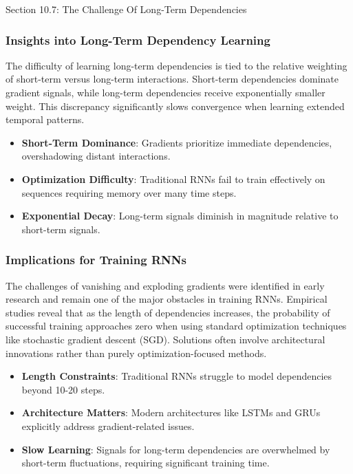 \begin{notes}{Section 10.7: The Challenge Of Long-Term Dependencies}
    \subsubsection*{Insights into Long-Term Dependency Learning}
    
    The difficulty of learning long-term dependencies is tied to the relative weighting of short-term versus long-term interactions. Short-term dependencies dominate gradient signals, while long-term 
    dependencies receive exponentially smaller weight. This discrepancy significantly slows convergence when learning extended temporal patterns.
    
    \begin{highlight}
        \begin{itemize}
            \item \textbf{Short-Term Dominance}: Gradients prioritize immediate dependencies, overshadowing distant interactions.
            \item \textbf{Optimization Difficulty}: Traditional RNNs fail to train effectively on sequences requiring memory over many time steps.
            \item \textbf{Exponential Decay}: Long-term signals diminish in magnitude relative to short-term signals.
        \end{itemize}
    \end{highlight}
    
    \subsubsection*{Implications for Training RNNs}
    
    The challenges of vanishing and exploding gradients were identified in early research and remain one of the major obstacles in training RNNs. Empirical studies reveal that as the length of dependencies 
    increases, the probability of successful training approaches zero when using standard optimization techniques like stochastic gradient descent (SGD). Solutions often involve architectural innovations 
    rather than purely optimization-focused methods.
    
    \begin{highlight}
        \begin{itemize}
            \item \textbf{Length Constraints}: Traditional RNNs struggle to model dependencies beyond 10-20 steps.
            \item \textbf{Architecture Matters}: Modern architectures like LSTMs and GRUs explicitly address gradient-related issues.
            \item \textbf{Slow Learning}: Signals for long-term dependencies are overwhelmed by short-term fluctuations, requiring significant training time.
        \end{itemize}
    \end{highlight}
    

\end{notes}
